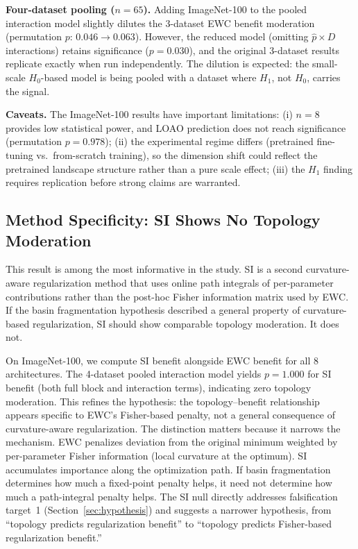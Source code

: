 \documentclass{article}
\begin{document}
\textbf{Four-dataset pooling ($n = 65$).} Adding ImageNet-100 to the pooled interaction model slightly dilutes the 3-dataset EWC benefit moderation (permutation $p$: $0.046 \to 0.063$). However, the reduced model (omitting $\hat{p} \times D$ interactions) retains significance ($p = 0.030$), and the original 3-dataset results replicate exactly when run independently. The dilution is expected: the small-scale $H_0$-based model is being pooled with a dataset where $H_1$, not $H_0$, carries the signal.

\textbf{Caveats.} The ImageNet-100 results have important limitations: (i) $n = 8$ provides low statistical power, and LOAO prediction does not reach significance (permutation $p = 0.978$); (ii) the experimental regime differs (pretrained fine-tuning vs.\ from-scratch training), so the dimension shift could reflect the pretrained landscape structure rather than a pure scale effect; (iii) the $H_1$ finding requires replication before strong claims are warranted.

\subsection{Method Specificity: SI Shows No Topology Moderation}
\label{sec:si}

This result is among the most informative in the study. SI \citep{zenke2017continual} is a second curvature-aware regularization method that uses online path integrals of per-parameter contributions rather than the post-hoc Fisher information matrix used by EWC. If the basin fragmentation hypothesis described a general property of curvature-based regularization, SI should show comparable topology moderation. It does not.

On ImageNet-100, we compute SI benefit alongside EWC benefit for all 8 architectures. The 4-dataset pooled interaction model yields $p = 1.000$ for SI benefit (both full block and interaction terms), indicating zero topology moderation. This refines the hypothesis: the topology--benefit relationship appears specific to EWC's Fisher-based penalty, not a general consequence of curvature-aware regularization. The distinction matters because it narrows the mechanism. EWC penalizes deviation from the original minimum weighted by per-parameter Fisher information (local curvature at the optimum). SI accumulates importance along the optimization path. If basin fragmentation determines how much a fixed-point penalty helps, it need not determine how much a path-integral penalty helps. The SI null directly addresses falsification target~1 (Section~\ref{sec:hypothesis}) and suggests a narrower hypothesis, from ``topology predicts regularization benefit'' to ``topology predicts Fisher-based regularization benefit.''
\end{document}
